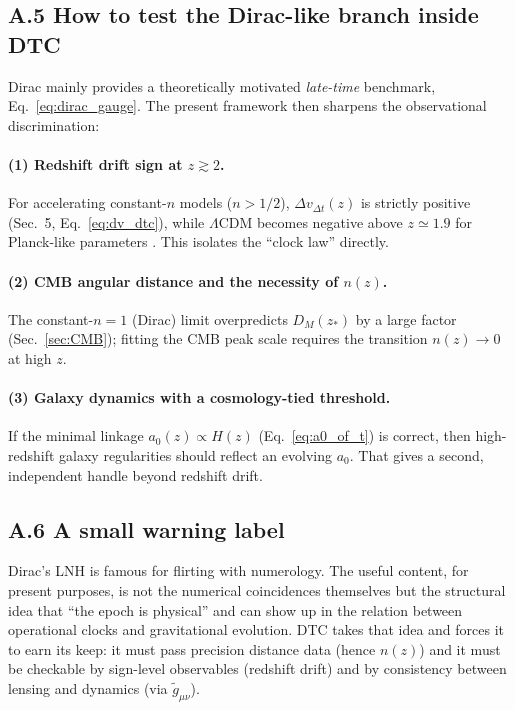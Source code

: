 \documentclass[12pt]{article}
\begin{document}
\subsection*{A.5 How to test the Dirac-like branch inside DTC}
Dirac mainly provides a theoretically motivated \emph{late-time} benchmark, Eq.~\eqref{eq:dirac_gauge}. The present framework then
sharpens the observational discrimination:

\paragraph{(1) Redshift drift sign at $z\gtrsim 2$.}
For accelerating constant-$n$ models ($n>1/2$), $\Delta v_{\Delta t}(z)$ is strictly positive (Sec.~5, Eq.~\eqref{eq:dv_dtc}),
while $\Lambda$CDM becomes negative above $z\simeq 1.9$ for Planck-like parameters \citep{Planck2018}.
This isolates the ``clock law'' directly.

\paragraph{(2) CMB angular distance and the necessity of $n(z)$.}
The constant-$n=1$ (Dirac) limit overpredicts $D_{M}(z_{*})$ by a large factor (Sec.~\ref{sec:CMB}); fitting the CMB peak scale
requires the transition $n(z)\to 0$ at high $z$.

\paragraph{(3) Galaxy dynamics with a cosmology-tied threshold.}
If the minimal linkage $a_{0}(z)\propto H(z)$ (Eq.~\eqref{eq:a0_of_t}) is correct, then high-redshift galaxy regularities should
reflect an evolving $a_{0}$. That gives a second, independent handle beyond redshift drift.

\subsection*{A.6 A small warning label}
Dirac's LNH is famous for flirting with numerology. The useful content, for present purposes, is not the
numerical coincidences themselves but the structural idea that ``the epoch is physical'' and can show up in the
relation between operational clocks and gravitational evolution. DTC takes that idea and forces it to earn its keep:
it must pass precision distance data (hence $n(z)$) and it must be checkable by sign-level observables (redshift drift)
and by consistency between lensing and dynamics (via $\tilde g_{\mu\nu}$).
\end{document}
